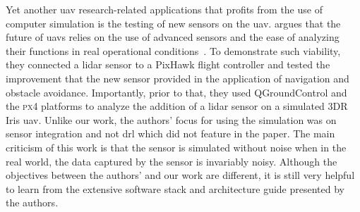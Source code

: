 \documentclass[../main.tex]{subfiles}
\begin{document}
Yet another \gls{uav} research-related applications 
that profits from the use of computer simulation 
is the testing of new sensors on the \gls{uav}.
\citeauthor{Gar20} argues that the future of \glspl{uav}
relies on the use of advanced sensors and 
the ease of analyzing their functions
in real operational conditions~\cite{Gar20}.
To demonstrate such viability, they connected a \gls{lidar} sensor
to a PixHawk flight controller and tested the improvement
that the new sensor provided
in the application of navigation and obstacle avoidance.
Importantly, prior to that, they used QGroundControl and the \textsc{px4}
platforms to analyze the addition of a \gls{lidar} sensor
on a simulated 3DR Iris \gls{uav}.
Unlike our work, the authors' focus for using the simulation
was on sensor integration and not \gls{drl} 
which did not feature in the paper. 
The main criticism of this work is that 
the sensor is simulated without noise
when in the real world, the data captured
by the sensor is invariably noisy.
Although the objectives between the authors' and our work
are different, it is still very helpful to learn from
the extensive software stack and architecture guide 
presented by the authors.



\blindtext
\end{document}
